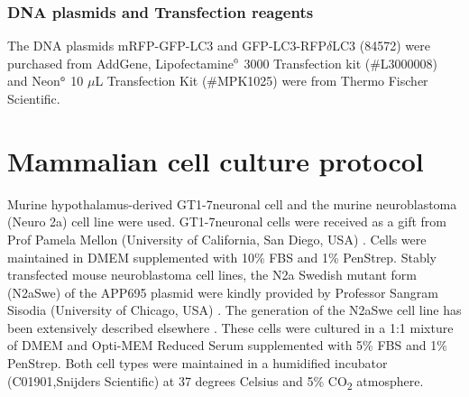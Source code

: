 \subsubsection{DNA plasmids and Transfection reagents}
The DNA plasmids mRFP-GFP-LC3 and GFP-LC3-RFP$\delta$LC3 (84572) were purchased from AddGene, Lipofectamine${\textsuperscript{\tiny{\textregistered}}}$ 3000 Transfection kit (\#L3000008) and Neon${\textsuperscript{\tiny{\textregistered}}}$ 10 $\mu$L Transfection Kit (\#MPK1025) were from Thermo Fischer Scientific.

\section{Mammalian cell culture protocol}
Murine hypothalamus-derived GT1-7neuronal cell and the murine neuroblastoma (Neuro 2a) cell line were used. GT1-7neuronal cells were received as a gift from Prof Pamela Mellon (University of California, San Diego, USA) \citep{Mellon1990}. Cells were maintained in DMEM supplemented with 10\% FBS and 1\% PenStrep. Stably transfected mouse neuroblastoma cell lines, the N2a Swedish mutant form (N2aSwe) of the APP695 plasmid were kindly provided by Professor Sangram Sisodia (University of Chicago, USA) \citep{Sisodia1990}. The generation of the N2aSwe cell line has been extensively described elsewhere \citep{Lo1994}. These cells were cultured in a 1:1 mixture of DMEM and Opti-MEM Reduced Serum supplemented with 5\% FBS and 1\% PenStrep. Both cell types were maintained in a humidified incubator (C01901,Snijders Scientific) at 37 degrees Celsius and 5\% CO\textsubscript{2} atmosphere.

